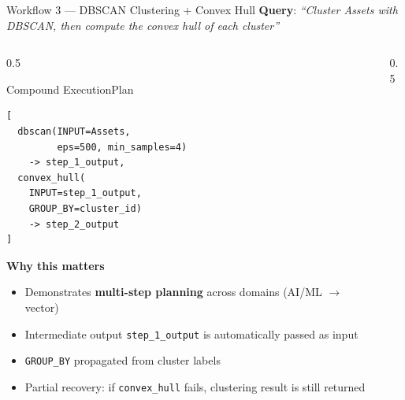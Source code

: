 \documentclass[aspectratio=169,11pt]{beamer}
\newcommand{\kw}[1]{{\color{geositeal}\bfseries #1}}
\begin{document}
\begin{frame}{Workflow 3 --- DBSCAN Clustering + Convex Hull}
  \small
  \textbf{Query}: \emph{``Cluster Assets with DBSCAN, then compute the convex hull of each cluster''}

  \vspace{0.3em}
  \begin{columns}[T,onlytextwidth]
    \begin{column}{0.5\textwidth}
      \begin{block}{Compound ExecutionPlan}
\begin{lstlisting}
[
  dbscan(INPUT=Assets,
         eps=500, min_samples=4)
    -> step_1_output,
  convex_hull(
    INPUT=step_1_output,
    GROUP_BY=cluster_id)
    -> step_2_output
]
\end{lstlisting}
      \end{block}
      \textbf{Why this matters}
      \begin{itemize}
        \item Demonstrates \kw{multi-step planning} across domains (AI/ML $\rightarrow$ vector)
        \item Intermediate output \texttt{step\_1\_output} is automatically passed as input
        \item \texttt{GROUP\_BY} propagated from cluster labels
        \item Partial recovery: if \texttt{convex\_hull} fails, clustering result is still returned
      \end{itemize}
    \end{column}
    \begin{column}{0.5\textwidth}
      \centering
\end{column}
\end{columns}
\end{frame}
\end{document}
